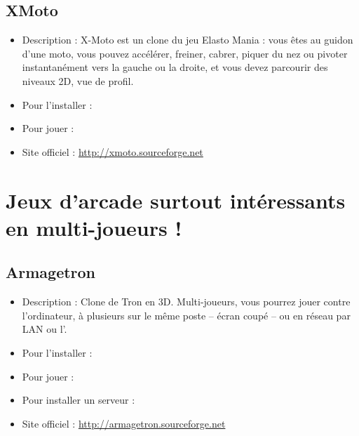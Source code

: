 \subsection{XMoto}
\begin{itemize}
\begingroup
{}
\item Description : X-Moto est un clone du jeu Elasto Mania : vous êtes au guidon d'une moto, vous pouvez accélérer, freiner, cabrer, piquer du nez ou pivoter instantanément vers la gauche ou la droite, et vous devez parcourir des niveaux 2D, vue de profil.{\par}
\item Pour l'installer : 
\item Pour jouer : 
\item Site officiel : \url{http://xmoto.sourceforge.net}{\par}
\endgroup
\end{itemize}
\section{Jeux d'arcade surtout intéressants en multi-joueurs !}
\subsection{Armagetron}
\begin{itemize}
\begingroup
{}
\item Description : Clone de Tron en 3D. Multi-joueurs, vous pourrez jouer contre l'ordinateur, à plusieurs sur le même poste -- écran coupé -- ou en réseau par LAN ou l'.{\par}
\endgroup
\item Pour l'installer : 
\item Pour jouer : 
\item Pour installer un serveur : 
\item Site officiel : \url{http://armagetron.sourceforge.net}{\par}
\end{itemize}
